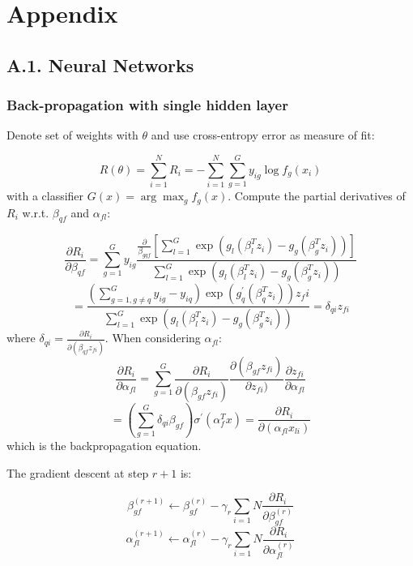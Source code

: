\documentclass[12pt,]{article}
\begin{document}
\clearpage
{}

\hypertarget{appendix}{%
\section{Appendix}\label{appendix}}

\hypertarget{a.1.-neural-networks}{%
\subsection{A.1. Neural Networks}\label{a.1.-neural-networks}}

\hypertarget{back-propagation-with-single-hidden-layer}{%
\subsubsection{Back-propagation with single hidden
layer}\label{back-propagation-with-single-hidden-layer}}

Denote set of weights with \(\theta\) and use cross-entropy error as
measure of fit:

\[R(\theta)=\sum_{i=1}^{N}R_i =-\sum_{i=1}^{N}\sum_{g=1}^{G}y_{ig}\log{f_g(x_i)}\]
with a classifier \(G(x)=\arg\max_{g}f_g(x)\). Compute the partial
derivatives of \(R_i\) w.r.t. \(\beta_{qf}\) and \(\alpha_{fl}\):

\[\frac{\partial R_i}{\partial \beta_{qf}}=\sum_{g=1}^{G}y_{ig}\frac{\frac{\partial}{\beta_{gqf}}[\sum_{l=1}^{G}\exp(g_l(\beta_{l}^{T}z_i)-g_g(\beta_{g}^{T}z_i))]}{\sum_{l=1}^{G}\exp(g_l(\beta_{l}^{T}z_i)-g_g(\beta_{g}^{T}z_i))}\]
\[=\frac{(\sum_{g=1,g\neq q}^{G}y_{ig}-y_{iq})\exp(g_{q}^{'}(\beta_q^Tz_i))z_fi}{\sum_{l=1}^{G}\exp(g_l(\beta_{l}^{T}z_i)-g_g(\beta_{g}^{T}z_i))}=\delta_{qi}z_{fi}\]
where \(\delta_{qi}=\frac{\partial R_i}{\partial (\beta_{qf} z_{fi})}\).
When considering \(\alpha_{fl}\):
\[\frac{\partial R_i}{\partial \alpha_{fl}}=\sum_{g=1}^{G}\frac{\partial R_i}{\partial (\beta_{gf}z_{fi})}\frac{\partial (\beta_{gf}z_{fi})}{\partial z_{fi})}\frac{\partial z_{fi}}{\partial \alpha_{fl}}\]
\[= (\sum_{g=1}^{G}\delta_{qi}\beta_{gf})\sigma^{'}(\alpha_{f}^{T}x)=\frac{\partial R_i}{\partial (\alpha_{fl}x_{li})}\]
which is the backpropagation equation.

The gradient descent at step \(r+1\) is:

\[\beta_{gf}^{(r+1)}\leftarrow\beta_{gf}^{(r)}-\gamma_r\sum_{i=1}{N}\frac{\partial R_i}{\partial \beta_{gf}^{(r)}}\]
\[\alpha_{fl}^{(r+1)}\leftarrow\alpha_{fl}^{(r)}-\gamma_r\sum_{i=1}{N}\frac{\partial R_i}{\partial \alpha_{fl}^{(r)}}\]
\end{document}
